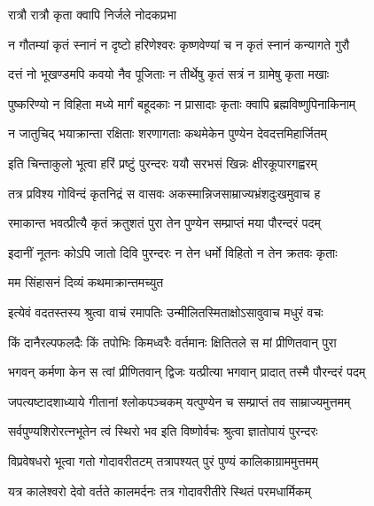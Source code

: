 \onelineshloka
{रात्रौ रात्रौ कृता क्वापि निर्जले नोदकप्रभा} %

\twolineshloka
{न गौतम्यां कृतं स्नानं न दृष्टो हरिणेश्वरः}
{कृष्णवेण्यां च न कृतं स्नानं कन्यागते गुरौ} %

\twolineshloka
{दत्तं नो भूखण्डमपि कवयो नैव पूजिताः}
{न तीर्थेषु कृतं सत्रं न ग्रामेषु कृता मखाः} %

\twolineshloka
{पुष्करिण्यो न विहिता मध्ये मार्गं बहूदकाः}
{न प्रासादाः कृताः क्वापि ब्रह्मविष्णुपिनाकिनाम्} %

\twolineshloka
{न जातुचिद् भयाक्रान्ता रक्षिताः शरणागताः}
{कथमेकेन पुण्येन देवदत्तमिहार्जितम्} %

\twolineshloka
{इति चिन्ताकुलो भूत्वा हरिं प्रष्टुं पुरन्दरः}
{ययौ सरभसं खिन्नः क्षीरकूपारगह्वरम्} %

\twolineshloka
{तत्र प्रविश्य गोविन्दं कृतनिद्रं स वासवः}
{अकस्मान्निजसाम्राज्यभ्रंशदुःखमुवाच ह} %


\twolineshloka
{रमाकान्त भवत्प्रीत्यै कृतं क्रतुशतं पुरा}
{तेन पुण्येन सम्प्राप्तं मया पौरन्दरं पदम्} %

\twolineshloka
{इदानीं नूतनः कोऽपि जातो दिवि पुरन्दरः}
{न तेन धर्मो विहितो न तेन क्रतवः कृताः} %

\onelineshloka
{मम सिंहासनं दिव्यं कथमाक्रान्तमच्युत} %


\twolineshloka
{इत्येवं वदतस्तस्य श्रुत्वा वाचं रमापतिः}
{उन्मीलितस्मिताक्षोऽसावुवाच मधुरं वचः} %


\twolineshloka
{किं दानैरल्पफलदैः किं तपोभिः किमध्वरैः}
{वर्तमानः क्षितितले स मां प्रीणितवान् पुरा} %


\twolineshloka
{भगवन् कर्मणा केन स त्वां प्रीणितवान् द्विजः}
{यत्प्रीत्या भगवान् प्रादात् तस्मै पौरन्दरं पदम्} %


\twolineshloka
{जपत्यष्टादशाध्याये गीतानां श्लोकपञ्चकम्}
{यत्पुण्येन च सम्प्राप्तं तव साम्राज्यमुत्तमम्} %

\twolineshloka
{सर्वपुण्यशिरोरत्नभूतेन त्वं स्थिरो भव}
{इति विष्णोर्वचः श्रुत्वा ज्ञातोपायं पुरन्दरः} %

\twolineshloka
{विप्रवेषधरो भूत्वा गतो गोदावरीतटम्}
{तत्रापश्यत् पुरं पुण्यं कालिकाग्राममुत्तमम्} %

\twolineshloka
{यत्र कालेश्वरो देवो वर्तते कालमर्दनः}
{तत्र गोदावरीतीरे स्थितं परमधार्मिकम्} %


